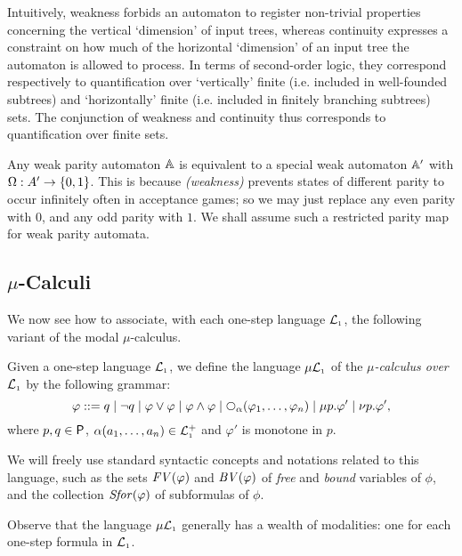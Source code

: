 Intuitively, weakness forbids an automaton to register non-trivial properties 
concerning the vertical `dimension' of input trees, whereas continuity expresses
a constraint on how much of the horizontal `dimension' of an input tree the 
automaton is allowed to process. 
In terms of second-order logic, they correspond respectively to quantification 
over `vertically' finite (i.e. included in well-founded subtrees) and 
`horizontally' finite (i.e. included in finitely branching subtrees) sets. 
The conjunction of weakness and continuity thus corresponds to quantification 
over finite sets. 

\begin{remark}\label{rmk:weak01}
Any weak parity automaton $\mathbb{A}$ is equivalent to a special weak automaton
$\mathbb{A}'$ with $\Omega: A' \to \{0,1\}$. 
This is because \emph{(weakness)} prevents states of different parity to occur
infinitely often in acceptance games; so we may just replace any even parity 
with $0$, and any odd parity with $1$.
We shall assume such a restricted parity map for weak parity automata.
\end{remark}

\subsection{$\mu$-Calculi}

We now see how to associate, with each one-step language $\mathcal{L}_{\scriptscriptstyle 1}$, the following
variant of the modal $\mu$-calculus.

\begin{definition}
Given a one-step language $\mathcal{L}_{\scriptscriptstyle 1}$, we define the language $\mu\mathcal{L}_{\scriptscriptstyle 1}$ of the 
\emph{$\mu$-calculus over $\mathcal{L}_{\scriptscriptstyle 1}$}  by the following grammar:
\[
\varphi ::= 
   q \mid \neg q 
   \mid \varphi\lor\varphi \mid \varphi\land\varphi 
   \mid \nxt{\al}(\varphi_{1},\ldots,\varphi_{n})
   \mid \mu p. \varphi'    \mid \nu p. \varphi',
\]
where $p,q \in\mathsf{P}$, $\alpha(a_{1},\ldots,a_{n}) \in \mathcal{L}_{\scriptscriptstyle 1}^{+}$ and $\varphi'$ 
is monotone in $p$.

We will freely use standard syntactic concepts and notations related to this 
language, such as the sets $\mathit{FV}(\varphi)$ and $\mathit{BV}(\varphi)$ of \emph{free} and 
\emph{bound} variables of $\phi$, and the collection $\mathit{Sfor}(\varphi)$ of subformulas
of $\phi$.
\end{definition}

Observe that the language $\mu\mathcal{L}_{\scriptscriptstyle 1}$ generally has a wealth of modalities:
one for each one-step formula in $\mathcal{L}_{\scriptscriptstyle 1}$.

